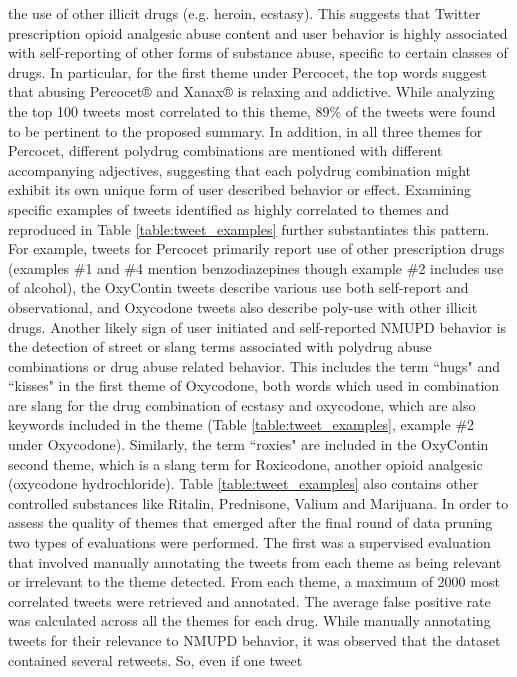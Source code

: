 the use of other illicit drugs (e.g. heroin, ecstasy). 
This suggests that Twitter prescription opioid analgesic abuse content 
and user behavior is highly associated with self-reporting of other forms 
of substance abuse, specific to certain classes of drugs. 
In particular, for the first theme under Percocet, the top words 
suggest that abusing Percocet® and Xanax® is relaxing and addictive. 
While analyzing the top 100 tweets most correlated to this theme, 89\% 
of the tweets were found to be pertinent to the proposed summary. 
In addition, in all three themes for Percocet, different polydrug 
combinations are mentioned with different accompanying adjectives, 
suggesting that each polydrug combination might exhibit its 
own unique form of user described behavior or effect. 
Examining specific examples of tweets identified as highly 
correlated to themes and reproduced in Table \ref{table:tweet_examples} 
further substantiates this pattern. For example, tweets for Percocet 
primarily report use of other prescription drugs 
(examples \#1 and \#4 mention benzodiazepines though example \#2 includes use of alcohol), 
the OxyContin tweets describe various use both 
self-report and observational, and Oxycodone tweets also 
describe poly-use with other illicit drugs.
%
Another likely sign of user initiated and self-reported NMUPD 
behavior is the detection of street or slang terms associated 
with polydrug abuse combinations or drug abuse related behavior. 
This includes the term ``hugs" and ``kisses" in the first theme of 
Oxycodone, both words which used in combination are slang for 
the drug combination of ecstasy and oxycodone, which are also 
keywords included in the theme (Table \ref{table:tweet_examples}, example \#2 under 
Oxycodone). Similarly, the term ``roxies" are included in the OxyContin second theme, 
which is a slang term for Roxicodone, another opioid analgesic (oxycodone hydrochloride). 
Table \ref{table:tweet_examples} also contains other controlled 
substances like Ritalin, Prednisone, Valium and Marijuana.
%
In order to assess the quality of themes that emerged after the 
final round of data pruning two types of evaluations were performed. 
The first was a supervised evaluation that involved manually annotating 
the tweets from each theme as being relevant or irrelevant to the theme detected. 
From each theme, a maximum of 2000 most correlated tweets were retrieved and annotated. 
The average false positive rate was calculated across all the themes for each drug. 
While manually annotating tweets for their relevance to NMUPD behavior, 
it was observed that the dataset contained several retweets. So, even if one tweet 
